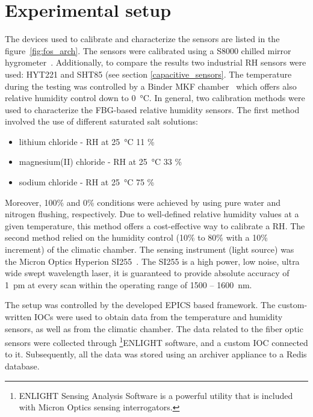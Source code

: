 \section{Experimental setup}
\label{fos:setup}
The devices used to calibrate and characterize the sensors are listed in the figure~\ref{fig:fos_arch}. The sensors were calibrated using a S8000 chilled mirror hygrometer~\cite{michell_s8000}. Additionally, to compare the results two industrial \gls{RH} sensors were used: HYT221 and SHT85 (see section \ref{capacitive_sensors}. The temperature during the testing was controlled by a Binder MKF chamber~\cite{binder} which offers also relative humidity control down to \SI{0}{\celsius}. 
In general, two calibration methods were used to characterize the \gls{FBG}-based relative humidity sensors. The first method involved the use of different saturated salt solutions:
\begin{itemize}
    \item lithium chloride - \gls{RH} at \SI{25}{\celsius} 11 \%
    \item magnesium(II) chloride - \gls{RH} at \SI{25}{\celsius} 33 \%
    \item sodium chloride - \gls{RH} at \SI{25}{\celsius} 75 \%
\end{itemize}
Moreover, 100\% and 0\% conditions were achieved by using pure water and nitrogen flushing, respectively. Due to well-defined relative humidity values at a given temperature, this method offers a cost-effective way to calibrate a \gls{RH}. The second method relied on the humidity control (10\% to 80\% with a 10\% increment) of the climatic chamber.  The sensing instrument (light source) was the Micron Optics Hyperion SI255~\cite{si255}. The SI255 is a high power, low noise, ultra wide swept wavelength laser, it is guaranteed to provide absolute accuracy of 1~pm at every scan within the operating range of 1500 -- 1600~nm. 

The setup was controlled by the developed \gls{EPICS} based framework. The custom-written \glspl{IOC} were used to obtain data from the temperature and humidity sensors, as well as from the climatic chamber. The data related to the fiber optic sensors were collected through \footnote{ENLIGHT Sensing Analysis Software is a powerful utility that is included with Micron
Optics sensing interrogators.}{ENLIGHT} software, and a custom \gls{IOC} connected to it. Subsequently, all the data was stored using an archiver appliance to a Redis database. 

